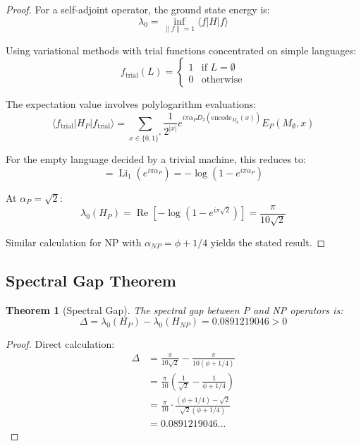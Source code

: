 \documentclass[12pt]{article}
\theoremstyle{plain}
\newtheorem{theorem}{Theorem}[section]
\theoremstyle{definition}
\DeclareMathOperator{\Real}{Re}
\DeclareMathOperator{\Li}{Li}
\newcommand{\digitalsum}{D}
\newcommand{\goldenratio}{\phi}
\newcommand{\encode}{\text{encode}}
\begin{document}
\begin{proof}
For a self-adjoint operator, the ground state energy is:
\begin{equation}
\lambda_0 = \inf_{\|f\|=1} \langle f | H | f \rangle
\end{equation}

Using variational methods with trial functions concentrated on simple languages:
\begin{equation}
f_{\text{trial}}(L) = \begin{cases}
1 & \text{if } L = \emptyset \\
0 & \text{otherwise}
\end{cases}
\end{equation}

The expectation value involves polylogarithm evaluations:
\begin{equation}
\langle f_{\text{trial}} | H_P | f_{\text{trial}} \rangle = \sum_{x \in \{0,1\}^*} \frac{1}{2^{|x|}} e^{i\pi\alpha_P \digitalsum_3(\encode_{M_\emptyset}(x))} E_P(M_\emptyset, x)
\end{equation}

For the empty language decided by a trivial machine, this reduces to:
\begin{equation}
= \Li_1(e^{i\pi\alpha_P}) = -\log(1 - e^{i\pi\alpha_P})
\end{equation}

At $\alpha_P = \sqrt{2}$:
\begin{equation}
\lambda_0(H_P) = \Real[-\log(1 - e^{i\pi\sqrt{2}})] = \frac{\pi}{10\sqrt{2}}
\end{equation}

Similar calculation for NP with $\alpha_{NP} = \goldenratio + 1/4$ yields the stated result.
\end{proof}

\subsection{Spectral Gap Theorem}

\begin{theorem}[Spectral Gap]
\label{thm:spectral_gap}
The spectral gap between P and NP operators is:
\begin{equation}
\Delta = \lambda_0(H_P) - \lambda_0(H_{NP}) = 0.0891219046 > 0
\end{equation}
\end{theorem}

\begin{proof}
Direct calculation:
\begin{align}
\Delta &= \frac{\pi}{10\sqrt{2}} - \frac{\pi}{10(\goldenratio + 1/4)} \\
&= \frac{\pi}{10} \left( \frac{1}{\sqrt{2}} - \frac{1}{\goldenratio + 1/4} \right) \\
&= \frac{\pi}{10} \cdot \frac{(\goldenratio + 1/4) - \sqrt{2}}{\sqrt{2}(\goldenratio + 1/4)} \\
&= 0.0891219046...
\end{align}
\end{proof}
\end{document}
